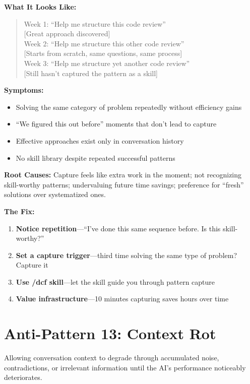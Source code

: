 \textbf{What It Looks Like:}

\begin{quote}
Week 1: ``Help me structure this code review''\\
{[Great approach discovered]}\\
Week 2: ``Help me structure this other code review''\\
{[Starts from scratch, same questions, same process]}\\
Week 3: ``Help me structure yet another code review''\\
{[Still hasn't captured the pattern as a skill]}
\end{quote}

\textbf{Symptoms:}
\begin{itemize}
    \item Solving the same category of problem repeatedly without efficiency gains
    \item ``We figured this out before'' moments that don't lead to capture
    \item Effective approaches exist only in conversation history
    \item No skill library despite repeated successful patterns
\end{itemize}

\textbf{Root Causes:} Capture feels like extra work in the moment; not recognizing skill-worthy patterns; undervaluing future time savings; preference for ``fresh'' solutions over systematized ones.

\textbf{The Fix:}
\begin{enumerate}
    \item \textbf{Notice repetition}---``I've done this same sequence before. Is this skill-worthy?''
    \item \textbf{Set a capture trigger}---third time solving the same type of problem? Capture it
    \item \textbf{Use /dcf skill}---let the skill guide you through pattern capture
    \item \textbf{Value infrastructure}---10 minutes capturing saves hours over time
\end{enumerate}

\section{Anti-Pattern 13: Context Rot}

Allowing conversation context to degrade through accumulated noise, contradictions, or irrelevant information until the AI's performance noticeably deteriorates.

